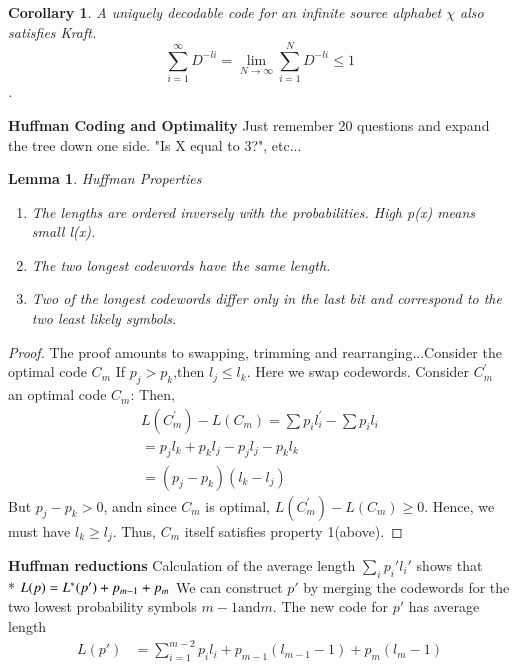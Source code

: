 \documentclass[10pt]{article}
\newtheorem{lemma}{Lemma}[section]
\newtheorem{corollary}{Corollary}[section]
\begin{document}
\begin{tiny}
\begin{multicols}{3}
\begin{corollary}A uniquely decodable code for an infinite source alphabet $\chi$ also satisfies Kraft. 
\[\sum_{i=1}^{\infty}D^{-li} = \lim_{N\rightarrow\infty}\sum_{i=1}^{N}D^{-li} \leq 1\].
\end{corollary}




\textbf{\scriptsize Huffman Coding and Optimality}
Just remember 20 questions and expand the tree down one side. "Is X equal to 3?", etc...
\begin{lemma}{Huffman Properties}\label{huffman}
\begin{enumerate}
	\item {\it The lengths are ordered inversely with the probabilities. High p(x) means small l(x).}
	\item {\it The two longest codewords have the same length.}
	\item {\it Two of the longest codewords differ only in the last bit and correspond to the two least likely symbols.}
\end{enumerate}
\end{lemma}
\begin{proof} The proof amounts to swapping, trimming and rearranging...Consider the optimal code ${C_m}$
If ${p_j} > {p_k} \text{,then } {l_j} \leq {l_k}$. Here we swap codewords. Consider $C_m^{'}$ an optimal code ${C_m}$:
Then, 
\begin{eqnarray}
L(C_m^{'}) - L(C_m) = \sum {p_i}{l_i^{'}} - \sum {p_i}{l_i} \\
={p_j}{l_k}+{p_k}{l_j} - {p_j}{l_j} - {p_k}{l_k}\\
=({p_j}-{p_k})({l_k}-{l_j})
\end{eqnarray}
But ${p_j} - {p_k} > 0$, andn since ${C_m}$ is optimal, $L(C_m^{'}) - L(C_m) \geq 0$.
Hence, we must have ${l_k} \geq {l_j}$. Thus, ${C_m}$ itself satisfies property 1(above).
\end{proof}
\textbf{\scriptsize Huffman reductions}
Calculation of the average length $\sum_i {p_i'}{l_i'}$ shows that \\*
$L(p) = L^{*}(p')+p_{m-1} + p_m\\$
We can construct ${p'}$ by merging the codewords for the two lowest probability symbols
${m-1} \text{and} {m}$.  The new code for ${p'}$ has average length
\begin{align*}
L(p') &= \sum_{i=1}^{m-2} p_i l_i + p_{m-1}(l_{m-1} -1 )+p_{m}(l_{m} -1)\\

\end{align*}
\end{multicols}
\end{tiny}
\end{document}
